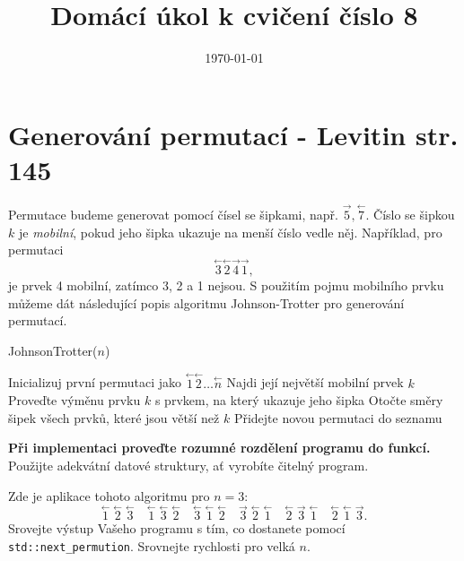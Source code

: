 \documentclass{article}
\title{Domácí úkol k cvičení číslo 8}
\author{}
\date{\today}
\begin{document}
	
\maketitle

\section*{Generování permutací - Levitin str. 145}
Permutace budeme generovat pomocí čísel se šipkami, např. $\overset{\rightarrow}{5}, \overset{\leftarrow}{7} $.
Číslo se šipkou \( k \) je \textit{mobilní}, pokud jeho šipka ukazuje na menší číslo vedle něj.
Například, pro permutaci
\[ \overset{\leftarrow}{3} \overset{\leftarrow}{2} \overset{\rightarrow}{4} \overset{\rightarrow}{1}, \]
je prvek 4 mobilní, zatímco 3, 2 a 1 nejsou.
S použitím pojmu mobilního prvku můžeme dát následující popis algoritmu Johnson-Trotter pro generování permutací.

\begin{algorithm}
	\caption{JohnsonTrotter($n$)}
	\begin{algorithmic}[1]
		\State Inicializuj první permutaci jako \( \overset{\leftarrow}{1} \overset{\leftarrow}{2} \ldots \overset{\leftarrow}{n} \)
		\State Najdi její největší mobilní prvek $k$
		\State Proveďte výměnu prvku $k$ s prvkem, na který ukazuje jeho šipka
		\State Otočte směry šipek všech prvků, které jsou větší než $k$
		\State Přidejte novou permutaci do seznamu
		\EndWhile
		\EndProcedure
	\end{algorithmic}
\end{algorithm}

\textbf{Při implementaci proveďte rozumné rozdělení programu do funkcí.}
Použijte adekvátní datové struktury, ať vyrobíte čitelný program.

Zde je aplikace tohoto algoritmu pro \( n = 3 \):
\[
\overset{\leftarrow}{1} \; \overset{\leftarrow}{2} \; \overset{\leftarrow}{3} \quad
\overset{\leftarrow}{1} \; \overset{\leftarrow}{3} \; \overset{\leftarrow}{2} \quad
\overset{\leftarrow}{3} \; \overset{\leftarrow}{1} \; \overset{\leftarrow}{2} \quad
\overset{\rightarrow}{3} \; \overset{\leftarrow}{2} \; \overset{\leftarrow}{1} \quad
\overset{\leftarrow}{2} \; \overset{\rightarrow}{3} \; \overset{\leftarrow}{1} \quad
\overset{\leftarrow}{2} \; \overset{\leftarrow}{1} \; \overset{\rightarrow}{3}.
\]
Srovejte výstup Vašeho programu s tím, co dostanete pomocí \verb|std::next_permution|.
Srovnejte rychlosti pro velká $n$.
\end{document}
